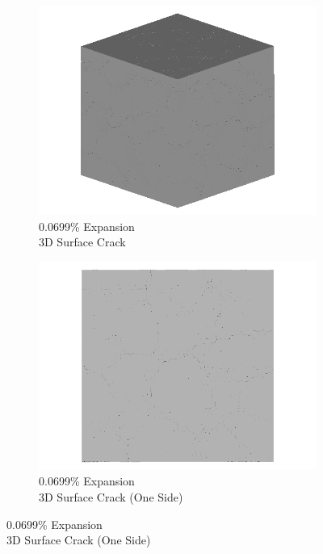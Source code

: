 \begin{figure}[ht!]
\centering
    \begin{subfigure}{.5\textwidth}
      \centering
      \includegraphics[width=0.5\linewidth]{Files/exp_3D/ASR/A15P75_1_3d.png}
      \caption{0.0699\% Expansion\\3D Surface Crack}
    \end{subfigure}%
    \begin{subfigure}{.5\textwidth}
      \centering
      \includegraphics[width=0.5\linewidth]{Files/exp_3D/ASR/A15P75_1_3ds.png}
      \caption{0.0699\% Expansion\\3D Surface Crack (One Side)}
    \end{subfigure}%


\end{figure}
